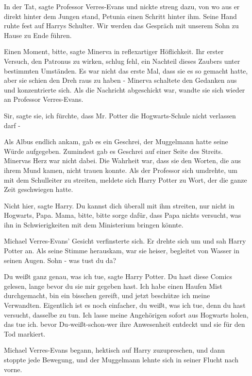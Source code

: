 \glqq{}In der Tat\grqq{}, sagte Professor Verres-Evans und nickte streng dazu,
von wo aus er direkt hinter dem Jungen stand, Petunia einen Schritt hinter ihm.
Seine Hand ruhte fest auf Harrys Schulter. \glqq{}Wir werden das Gespräch mit
unserem Sohn zu Hause zu Ende führen.\grqq{}

\glqq{}Einen Moment, bitte\grqq{}, sagte Minerva in reflexartiger Höflichkeit.
Ihr erster Versuch, den Patronus zu wirken, schlug fehl, ein Nachteil dieses
Zaubers unter bestimmten Umständen. Es war nicht das erste Mal, dass sie es so
gemacht hatte, aber sie schien den Dreh raus zu haben - Minerva schaltete den
Gedanken aus und konzentrierte sich. Als die Nachricht abgeschickt war, wandte
sie sich wieder an Professor Verres-Evans.

\glqq{}Sir\grqq{}, sagte sie, \glqq{}ich fürchte, dass Mr. Potter die
Hogwarts-Schule nicht verlassen darf -\grqq{}

Als Albus endlich ankam, gab es ein Geschrei, der Muggelmann hatte seine Würde
aufgegeben. Zumindest gab es Geschrei auf einer Seite des Streits. Minervas Herz
war nicht dabei. Die Wahrheit war, dass sie den Worten, die aus ihrem Mund
kamen, nicht trauen konnte. Als der Professor sich umdrehte, um mit dem
Schulleiter zu streiten, meldete sich Harry Potter zu Wort, der die ganze Zeit
geschwiegen hatte.

\glqq{}Nicht hier\grqq{}, sagte Harry. \glqq{}Du kannst dich überall mit ihm
streiten, nur nicht in Hogwarts, Papa. Mama, bitte, bitte sorge dafür, dass Papa
nichts versucht, was ihn in Schwierigkeiten mit dem Ministerium bringen
könnte.\grqq{}

Michael Verres-Evans' Gesicht verfinsterte sich. Er drehte sich um und sah Harry
Potter an. Als seine Stimme herauskam, war sie heiser, begleitet von Wasser in
seinen Augen. \glqq{}Sohn - was tust du da?\grqq{}

\glqq{}Du weißt ganz genau, was ich tue\grqq{}, sagte Harry Potter. \glqq{}Du hast
diese Comics gelesen, lange bevor du sie mir gegeben hast. Ich habe einen Haufen
Mist durchgemacht, bin ein bisschen gereift, und jetzt beschütze ich meine
Verwandten. Eigentlich ist es noch einfacher, du weißt, was ich tue, denn du
hast versucht, dasselbe zu tun. Ich lasse meine Angehörigen sofort aus Hogwarts
holen, das tue ich. bevor Du-weißt-schon-wer ihre Anwesenheit entdeckt und sie
für den Tod markiert.\grqq{}

Michael Verres-Evans begann, hektisch auf Harry zuzupreschen, und dann stoppte
jede Bewegung, und der Muggelmann lehnte sich in seiner Flucht nach vorne.

